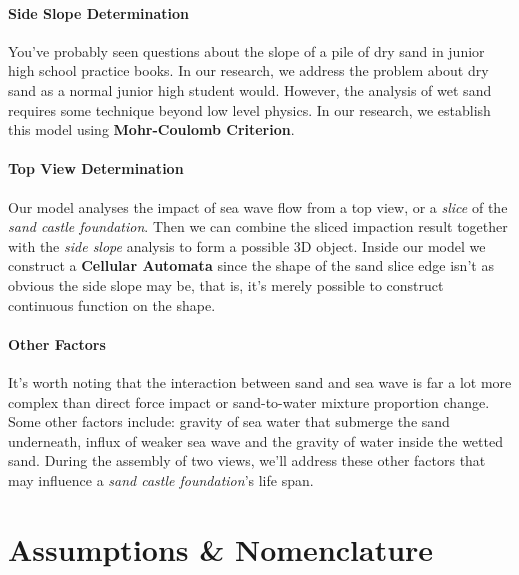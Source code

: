 \documentclass[12pt]{article}
\begin{document}
\paragraph{Side Slope Determination}
You've probably seen questions about the slope of a pile of dry sand in junior high school practice books. In our research, we address the problem about dry sand as a normal junior high student would. However, the analysis of wet sand requires some technique beyond low level physics. In our research, we establish this model using \textbf{Mohr-Coulomb Criterion}.

\paragraph{Top View Determination}
Our model analyses the impact of sea wave flow from a top view, or a \textit{slice} of the \textit{sand castle foundation}. Then we can combine the sliced impaction result together with the \textit{side slope} analysis to form a possible 3D object. Inside our model we construct a \textbf{Cellular Automata} since the shape of the sand slice edge isn't as obvious the side slope may be, that is, it's merely possible to construct continuous function on the shape.

\paragraph{Other Factors}
It's worth noting that the interaction between sand and sea wave is far a lot more complex than direct force impact or sand-to-water mixture proportion change. Some other factors include: gravity of sea water that submerge the sand underneath, influx of weaker sea wave and the gravity of water inside the wetted sand. During the assembly of two views, we'll address these other factors that may influence a \textit{sand castle foundation}'s life span.

\section{Assumptions \& Nomenclature}
\end{document}
